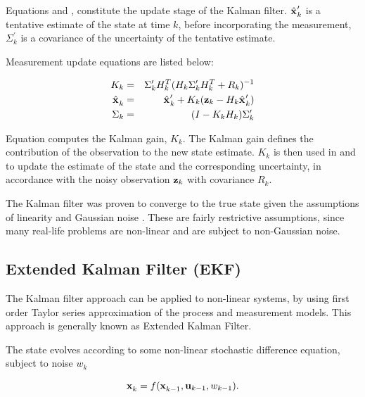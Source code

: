 Equations  and
, constitute the update stage of the
Kalman filter. $\hat{\x{}{}{}}_k^\prime$ is a tentative estimate of
the state at time $k$, before incorporating the measurement,
$\Sigma_k^\prime$ is a covariance of the uncertainty of the tentative
estimate.

Measurement update equations are listed below:

\begin{eqnarray}
\label{eqn:kalman_gain}
K_k &=& \Sigma_k^\prime H_k^T (H_k \Sigma_k^\prime H_k^T + R_k )^{-1}\\
\label{eqn:kalman_x_obs}
\hat{\x{}{}{}}_k &=& \hat{\x{}{}{}}_k^\prime + 
                      K_k (\z{k} - H_k \hat{\x{}{}{}}_k^\prime)\\
\label{eqn:kalman_sigma_obs}
\Sigma_k &=& (I - K_k H_k) \Sigma_k^\prime
\end{eqnarray}

Equation  computes the Kalman gain,
$K_k$. The Kalman gain defines the contribution of the observation to
the new state estimate. $K_k$ is then used in
 and  
to update the estimate of the state and the corresponding uncertainty,
in accordance with the noisy observation ${\bf z}_{k}$ with covariance
$R_k$.

The Kalman filter was proven to converge to the true state given the
assumptions of linearity and Gaussian noise \cite{kalman60}. These are
fairly restrictive assumptions, since many real-life problems
are non-linear and are subject to non-Gaussian noise.

\subsection{Extended Kalman Filter (EKF)}
\label{sec:EKF}

The Kalman filter approach can be applied to non-linear systems, by
using first order Taylor series approximation of the process and
measurement models. This approach is generally known as Extended
Kalman Filter.

The state  evolves according to some non-linear stochastic
difference equation, subject to noise $w_{k}$

\begin{equation}
   \x{k}{}{} = f (\x{k-1}{}{}, \U{k-1}, w_{k-1}).
\label{eqn:ekf_process}
\end{equation}

